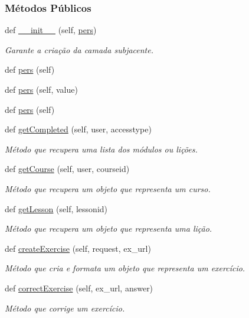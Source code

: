 \subsubsection*{Métodos Públicos}
\begin{DoxyCompactItemize}
\item 
def \hyperlink{classCourse_1_1CourseUnit_1_1IfBusCourse_a8bcb71202e7d221f7a8cc4265f09158e}{\+\_\+\+\_\+init\+\_\+\+\_\+} (self, \hyperlink{classCourse_1_1CourseUnit_1_1IfBusCourse_ab926ae8fb127b7697e2b63025df09a78}{pers})
\begin{DoxyCompactList}\small\item\em Garante a criação da camada subjacente. \end{DoxyCompactList}\item 
def \hyperlink{classCourse_1_1CourseUnit_1_1IfBusCourse_a7942e9a93e317a21a876f1c0ee851c0d}{pers} (self)
\item 
def \hyperlink{classCourse_1_1CourseUnit_1_1IfBusCourse_a4fcbdd85c4800dcb00b234bad4ee13f5}{pers} (self, value)
\item 
def \hyperlink{classCourse_1_1CourseUnit_1_1IfBusCourse_a7942e9a93e317a21a876f1c0ee851c0d}{pers} (self)
\item 
def \hyperlink{classCourse_1_1CourseUnit_1_1IfBusCourse_af764ac539a72d830490a80e4d70f567a}{get\+Completed} (self, user, accesstype)
\begin{DoxyCompactList}\small\item\em Método que recupera uma lista dos módulos ou lições. \end{DoxyCompactList}\item 
def \hyperlink{classCourse_1_1CourseUnit_1_1IfBusCourse_a35ae9c09ba977c6f37f97e204ac137cd}{get\+Course} (self, user, courseid)
\begin{DoxyCompactList}\small\item\em Método que recupera um objeto que representa um curso. \end{DoxyCompactList}\item 
def \hyperlink{classCourse_1_1CourseUnit_1_1IfBusCourse_a528e12ea84cb348f2c349613ed62f586}{get\+Lesson} (self, lessonid)
\begin{DoxyCompactList}\small\item\em Método que recupera um objeto que representa uma lição. \end{DoxyCompactList}\item 
def \hyperlink{classCourse_1_1CourseUnit_1_1IfBusCourse_a1467691a3312e00b43e92c30456d226f}{create\+Exercise} (self, request, ex\+\_\+url)
\begin{DoxyCompactList}\small\item\em Método que cria e formata um objeto que representa um exercício. \end{DoxyCompactList}\item 
def \hyperlink{classCourse_1_1CourseUnit_1_1IfBusCourse_a2dab60981cdb691f1b95b5ed4a4022d8}{correct\+Exercise} (self, ex\+\_\+url, answer)
\begin{DoxyCompactList}\small\item\em Método que corrige um exercício. \end{DoxyCompactList}\end{DoxyCompactItemize}

